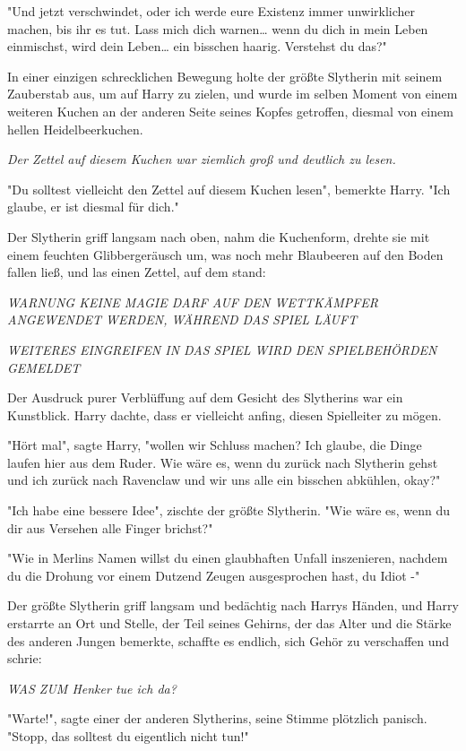 {"Und jetzt verschwindet, oder ich werde eure Existenz immer unwirklicher machen, bis ihr es tut. Lass mich dich warnen… wenn du dich in mein Leben einmischst, wird dein Leben… ein bisschen haarig. Verstehst du das?"

In einer einzigen schrecklichen Bewegung holte der größte Slytherin mit seinem Zauberstab aus, um auf Harry zu zielen, und wurde im selben Moment von einem weiteren Kuchen an der anderen Seite seines Kopfes getroffen, diesmal von einem hellen Heidelbeerkuchen.

\emph{Der Zettel auf diesem Kuchen war ziemlich groß und deutlich zu lesen.}

"Du solltest vielleicht den Zettel auf diesem Kuchen lesen", bemerkte Harry. "Ich glaube, er ist diesmal für dich."

Der Slytherin griff langsam nach oben, nahm die Kuchenform, drehte sie mit einem feuchten Glibbergeräusch um, was noch mehr Blaubeeren auf den Boden fallen ließ, und las einen Zettel, auf dem stand:

\emph{WARNUNG KEINE MAGIE DARF AUF DEN WETTKÄMPFER ANGEWENDET WERDEN, WÄHREND DAS SPIEL LÄUFT}

\emph{WEITERES EINGREIFEN IN DAS SPIEL WIRD DEN SPIELBEHÖRDEN GEMELDET}

Der Ausdruck purer Verblüffung auf dem Gesicht des Slytherins war ein Kunstblick. Harry dachte, dass er vielleicht anfing, diesen Spielleiter zu mögen.

"Hört mal", sagte Harry, "wollen wir Schluss machen? Ich glaube, die Dinge laufen hier aus dem Ruder. Wie wäre es, wenn du zurück nach Slytherin gehst und ich zurück nach Ravenclaw und wir uns alle ein bisschen abkühlen, okay?"

"Ich habe eine bessere Idee", zischte der größte Slytherin. "Wie wäre es, wenn du dir aus Versehen alle Finger brichst?"

"Wie in Merlins Namen willst du einen glaubhaften Unfall inszenieren, nachdem du die Drohung vor einem Dutzend Zeugen ausgesprochen hast, du Idiot -"

Der größte Slytherin griff langsam und bedächtig nach Harrys Händen, und Harry erstarrte an Ort und Stelle, der Teil seines Gehirns, der das Alter und die Stärke des anderen Jungen bemerkte, schaffte es endlich, sich Gehör zu verschaffen und schrie:

\emph{WAS ZUM Henker tue ich da?}

"Warte!", sagte einer der anderen Slytherins, seine Stimme plötzlich panisch. "Stopp, das solltest du eigentlich nicht tun!"

}
